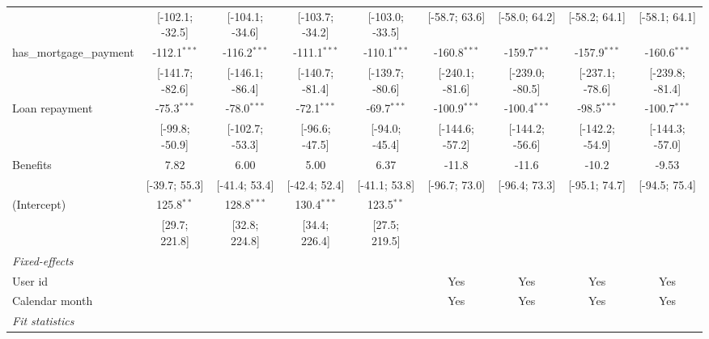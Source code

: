 \begin{table}[htbp]
\begin{threeparttable}[b]
\begin{tabular}{lcccccccc}
                                  & [-102.1; -32.5]  & [-104.1; -34.6]  & [-103.7; -34.2]  & [-103.0; -33.5]  & [-58.7; 63.6]    & [-58.0; 64.2]    & [-58.2; 64.1]    & [-58.1; 64.1]\\   
         has\_mortgage\_payment   & -112.1$^{***}$   & -116.2$^{***}$   & -111.1$^{***}$   & -110.1$^{***}$   & -160.8$^{***}$   & -159.7$^{***}$   & -157.9$^{***}$   & -160.6$^{***}$\\   
                                  & [-141.7; -82.6]  & [-146.1; -86.4]  & [-140.7; -81.4]  & [-139.7; -80.6]  & [-240.1; -81.6]  & [-239.0; -80.5]  & [-237.1; -78.6]  & [-239.8; -81.4]\\   
         Loan repayment           & -75.3$^{***}$    & -78.0$^{***}$    & -72.1$^{***}$    & -69.7$^{***}$    & -100.9$^{***}$   & -100.4$^{***}$   & -98.5$^{***}$    & -100.7$^{***}$\\   
                                  & [-99.8; -50.9]   & [-102.7; -53.3]  & [-96.6; -47.5]   & [-94.0; -45.4]   & [-144.6; -57.2]  & [-144.2; -56.6]  & [-142.2; -54.9]  & [-144.3; -57.0]\\   
         Benefits                 & 7.82             & 6.00             & 5.00             & 6.37             & -11.8            & -11.6            & -10.2            & -9.53\\   
                                  & [-39.7; 55.3]    & [-41.4; 53.4]    & [-42.4; 52.4]    & [-41.1; 53.8]    & [-96.7; 73.0]    & [-96.4; 73.3]    & [-95.1; 74.7]    & [-94.5; 75.4]\\   
         (Intercept)              & 125.8$^{**}$     & 128.8$^{***}$    & 130.4$^{***}$    & 123.5$^{**}$     &                  &                  &                  &   \\   
                                  & [29.7; 221.8]    & [32.8; 224.8]    & [34.4; 226.4]    & [27.5; 219.5]    &                  &                  &                  &   \\   
         \midrule
         \emph{Fixed-effects}\\
         User id                  &                  &                  &                  &                  & Yes              & Yes              & Yes              & Yes\\  
         Calendar month           &                  &                  &                  &                  & Yes              & Yes              & Yes              & Yes\\  
         \midrule
         \emph{Fit statistics}\\

\end{tabular}
\end{threeparttable}
\end{table}
